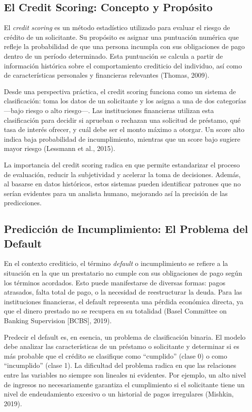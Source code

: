 \documentclass[12pt,a4paper]{article}
\begin{document}
\subsection{El Credit Scoring: Concepto y Propósito}

El \textit{credit scoring} es un método estadístico utilizado para evaluar el riesgo de crédito de un solicitante. Su propósito es asignar una puntuación numérica que refleje la probabilidad de que una persona incumpla con sus obligaciones de pago dentro de un período determinado. Esta puntuación se calcula a partir de información histórica sobre el comportamiento crediticio del individuo, así como de características personales y financieras relevantes (Thomas, 2009).

Desde una perspectiva práctica, el credit scoring funciona como un sistema de clasificación: toma los datos de un solicitante y los asigna a una de dos categorías ---bajo riesgo o alto riesgo---. Las instituciones financieras utilizan esta clasificación para decidir si aprueban o rechazan una solicitud de préstamo, qué tasa de interés ofrecer, y cuál debe ser el monto máximo a otorgar. Un score alto indica baja probabilidad de incumplimiento, mientras que un score bajo sugiere mayor riesgo (Lessmann et al., 2015).

La importancia del credit scoring radica en que permite estandarizar el proceso de evaluación, reducir la subjetividad y acelerar la toma de decisiones. Además, al basarse en datos históricos, estos sistemas pueden identificar patrones que no serían evidentes para un analista humano, mejorando así la precisión de las predicciones.

\subsection{Predicción de Incumplimiento: El Problema del Default}

En el contexto crediticio, el término \textit{default} o incumplimiento se refiere a la situación en la que un prestatario no cumple con sus obligaciones de pago según los términos acordados. Esto puede manifestarse de diversas formas: pagos atrasados, falta total de pago, o la necesidad de reestructurar la deuda. Para las instituciones financieras, el default representa una pérdida económica directa, ya que el dinero prestado no se recupera en su totalidad (Basel Committee on Banking Supervision [BCBS], 2019).

Predecir el default es, en esencia, un problema de clasificación binaria. El modelo debe analizar las características de un préstamo o solicitante y determinar si es más probable que el crédito se clasifique como ``cumplido'' (clase 0) o como ``incumplido'' (clase 1). La dificultad del problema radica en que las relaciones entre las variables no siempre son lineales ni evidentes. Por ejemplo, un alto nivel de ingresos no necesariamente garantiza el cumplimiento si el solicitante tiene un nivel de endeudamiento excesivo o un historial de pagos irregulares (Mishkin, 2019).
\end{document}
